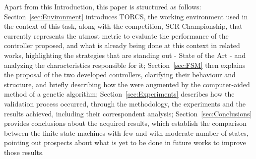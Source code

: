 	Apart from this Introduction, this paper is structured as follows: Section~\ref{sec:Environment} introduces
	TORCS, the working environment used in the context of this task, along with the competition, SCR Championship,
	that currently represents the utmost metric to evaluate the performance of the controller proposed, and what is
	already being done at this context in related works, highlighting the strategies that are standing out - State of
	the Art - and analyzing the characteristics responsible for it; Section~\ref{sec:FSM} then explains the proposal
	of the two developed controllers, clarifying their behaviour and structure, and briefly describing how the were
	augmented by the computer-aided method of a genetic algorithm; Section~\ref{sec:Experiments} describes how the
	validation process occurred, through the methodology, the experiments and the results achieved, including their
	correspondent analysis; Section~\ref{sec:Conclusions} provides conclusions about the acquired results, which
	establish the comparison between the finite state machines with few and with moderate number of states, pointing
	out prospects about what is yet to be done in future works to improve those results.
